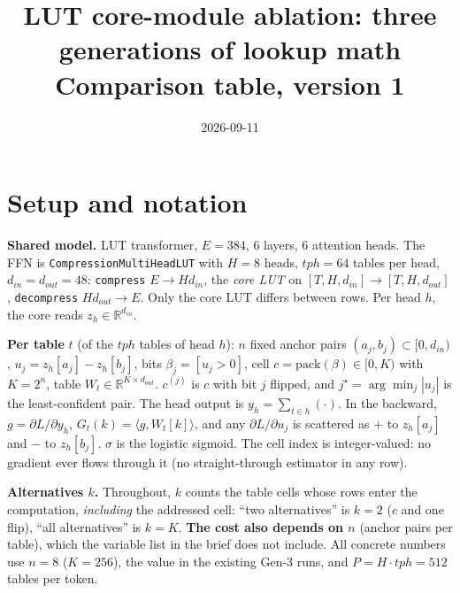 \documentclass[10pt]{article}
\title{LUT core-module ablation: three generations of lookup math\\[2pt]
\large Comparison table, version 1}
\date{2026-09-11}
\author{}
\newcommand{\code}[1]{{\renewcommand{\_}{\textunderscore\allowbreak}\texttt{#1}}}
\begin{document}
\maketitle
\vspace{-2.5em}

\section*{Setup and notation}
\textbf{Shared model.} LUT transformer, $E=384$, 6 layers, 6 attention heads. The FFN is
\code{CompressionMultiHeadLUT} with $H=8$ heads, $tph=64$ tables per head, $d_{in}=d_{out}=48$:
\code{compress} $E\to H d_{in}$, the \emph{core LUT} on $[T,H,d_{in}]\to[T,H,d_{out}]$, \code{decompress}
$H d_{out}\to E$. Only the core LUT differs between rows. Per head $h$, the core reads $z_h\in\mathbb R^{d_{in}}$.

\textbf{Per table} $t$ (of the $tph$ tables of head $h$): $n$ fixed anchor pairs $(a_j,b_j)\subset[0,d_{in})$,
$u_j=z_h[a_j]-z_h[b_j]$, bits $\beta_j=[u_j>0]$, cell $c=\mathrm{pack}(\beta)\in[0,K)$ with $K=2^n$,
table $W_t\in\mathbb R^{K\times d_{out}}$. $c^{(j)}$ is $c$ with bit $j$ flipped, and
$j^\star=\arg\min_j|u_j|$ is the least-confident pair. The head output is $y_h=\sum_{t\in h}(\cdot)$.
In the backward, $g=\partial L/\partial y_h$, $G_t(k)=\langle g,W_t[k]\rangle$, and any
$\partial L/\partial u_j$ is scattered as $+$ to $z_h[a_j]$ and $-$ to $z_h[b_j]$. $\sigma$ is the logistic sigmoid.
The cell index is integer-valued: no gradient ever flows through it (no straight-through estimator in any row).

\textbf{Alternatives $k$.} Throughout, $k$ counts the table cells whose rows enter the computation, \emph{including}
the addressed cell: ``two alternatives'' is $k=2$ ($c$ and one flip), ``all alternatives'' is $k=K$.
\textbf{The cost also depends on $n$} (anchor pairs per table), which the variable list in the brief does not include.
All concrete numbers use $n=8$ ($K=256$), the value in the existing Gen-3 runs, and $P=H\cdot tph=512$ tables per token.
\end{document}
